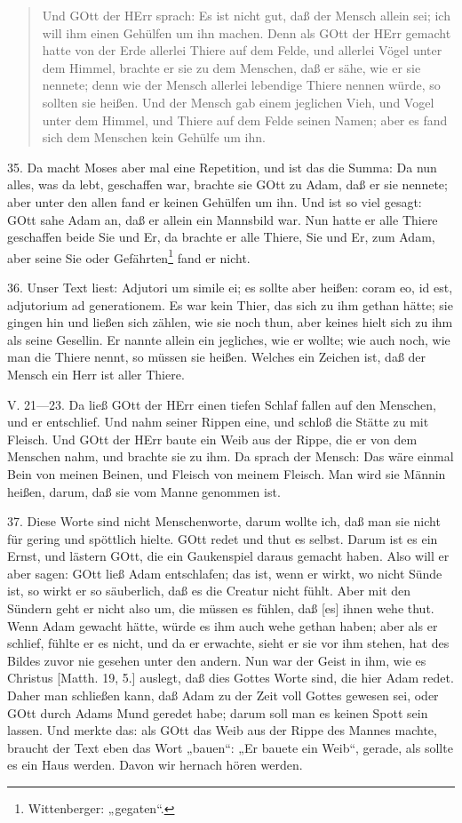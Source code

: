 \begin{quote}
Und GOtt der HErr sprach: Es ist nicht gut, daß der Mensch allein sei; ich will ihm einen Gehülfen um ihn machen. Denn als GOtt der HErr gemacht hatte von der Erde allerlei Thiere auf dem Felde, und allerlei Vögel unter dem Himmel, brachte er sie zu dem Menschen, daß er sähe, wie er sie nennete; denn wie der Mensch allerlei lebendige Thiere nennen würde, so sollten sie heißen. Und der Mensch gab einem jeglichen Vieh, und Vogel unter dem Himmel, und Thiere auf dem Felde seinen Namen; aber es fand sich dem Menschen kein Gehülfe um ihn.
\end{quote}

35. Da macht Moses aber mal eine Repetition, und ist das die Summa: Da nun alles, was da lebt, geschaffen war, brachte sie GOtt zu Adam, daß er sie nennete; aber unter den allen fand er keinen Gehülfen um ihn. Und ist so viel gesagt: GOtt sahe Adam an, daß er allein ein Mannsbild war. Nun hatte er alle Thiere geschaffen beide Sie und Er, da brachte er alle Thiere, Sie und Er, zum Adam, aber seine Sie oder Gefährten\footnote{Wittenberger: „gegaten“.} fand er nicht.

36. Unser Text liest: Adjutori um simile ei; es sollte aber heißen: coram eo, id est, adjutorium ad generationem. Es war kein Thier, das sich zu ihm gethan hätte; sie gingen hin und ließen sich zählen, wie sie noch thun, aber
keines hielt sich zu ihm als seine Gesellin. Er nannte allein ein jegliches, wie er wollte; wie auch noch, wie man die Thiere nennt, so müssen sie heißen. Welches ein Zeichen ist, daß der Mensch ein Herr ist aller Thiere.

V. 21—23. Da ließ GOtt der HErr einen tiefen Schlaf fallen auf den Menschen, und er entschlief. Und nahm seiner Rippen eine, und schloß die Stätte zu mit Fleisch. Und GOtt der HErr baute ein Weib aus der Rippe, die er von dem Menschen nahm, und brachte sie zu ihm. Da sprach der Mensch: Das wäre einmal Bein von meinen Beinen, und Fleisch von meinem Fleisch. Man wird sie Männin heißen, darum, daß sie vom Manne genommen ist.

37. Diese Worte sind nicht Menschenworte, darum wollte ich, daß man sie nicht für gering und spöttlich hielte. GOtt redet und thut es selbst. Darum ist es ein Ernst, und lästern GOtt, die ein Gaukenspiel daraus gemacht haben. Also will er aber sagen: GOtt ließ Adam entschlafen; das ist, wenn er wirkt, wo nicht Sünde ist, so wirkt er so säuberlich, daß es die Creatur nicht fühlt. Aber mit den Sündern geht er nicht also um, die müssen es fühlen, daß [es] ihnen wehe thut. Wenn Adam gewacht hätte, würde es ihm auch wehe gethan haben; aber als er schlief, fühlte er es nicht, und da er erwachte, sieht er sie vor ihm stehen, hat des Bildes zuvor nie gesehen unter den andern. Nun war der Geist in ihm, wie es Christus [Matth. 19, 5.] auslegt, daß dies Gottes Worte sind, die hier Adam redet. Daher man schließen kann, daß Adam zu der Zeit voll Gottes gewesen sei, oder GOtt durch Adams Mund geredet habe; darum soll man es keinen Spott sein lassen. Und merkte das: als GOtt das Weib aus der Rippe des Mannes machte, braucht der Text eben das Wort „bauen“: „Er bauete ein Weib“, gerade, als sollte es ein Haus werden. Davon wir hernach hören werden.

